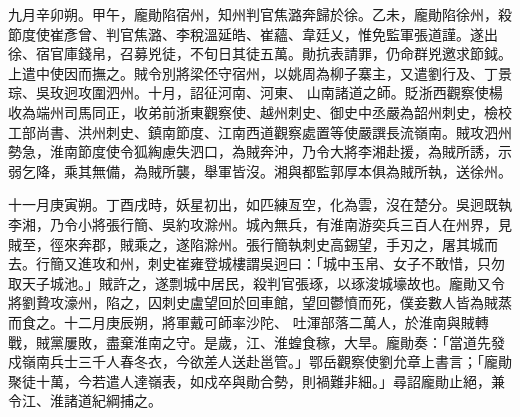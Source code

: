 \begin{pinyinscope}
 九月辛卯朔。甲午，龐勛陷宿州，知州判官焦潞奔歸於徐。乙未，龐勛陷徐州，殺節度使崔彥曾、判官焦潞、李稅溫延皓、崔蘊、韋廷乂，惟免監軍張道謹。遂出徐、宿官庫錢帛，召募兇徒，不旬日其徒五萬。勛抗表請罪，仍命群兇邀求節鉞。上遣中使因而撫之。賊令別將梁伾守宿州，以姚周為柳子寨主，又遣劉行及、丁景琮、吳玫迥攻圍泗州。十月，詔征河南、河東、
 山南諸道之師。貶浙西觀察使楊收為端州司馬同正，收弟前浙東觀察使、越州刺史、御史中丞嚴為韶州刺史，檢校工部尚書、洪州刺史、鎮南節度、江南西道觀察處置等使嚴譔長流嶺南。賊攻泗州勢急，淮南節度使令狐綯慮失泗口，為賊奔沖，乃令大將李湘赴援，為賊所誘，示弱乞降，乘其無備，為賊所襲，舉軍皆沒。湘與都監郭厚本俱為賊所執，送徐州。



 十一月庚寅朔。丁酉戌時，妖星初出，如匹練亙空，化為雲，沒在楚分。吳迥既執
 李湘，乃令小將張行簡、吳約攻滁州。城內無兵，有淮南游奕兵三百人在州界，見賊至，徑來奔郡，賊乘之，遂陷滁州。張行簡執刺史高錫望，手刃之，屠其城而去。行簡又進攻和州，刺史崔雍登城樓謂吳迥曰：「城中玉帛、女子不敢惜，只勿取天子城池。」賊許之，遂剽城中居民，殺判官張琢，以琢浚城壕故也。龐勛又令將劉贄攻濠州，陷之，囚刺史盧望回於回車館，望回鬱憤而死，僕妾數人皆為賊蒸而食之。十二月庚辰朔，將軍戴可師率沙陀、
 吐渾部落二萬人，於淮南與賊轉戰，賊黨屢敗，盡棄淮南之守。是歲，江、淮蝗食稼，大旱。龐勛奏：「當道先發戍嶺南兵士三千人春冬衣，今欲差人送赴邕管。」鄂岳觀察使劉允章上書言；「龐勛聚徒十萬，今若遣人達嶺表，如戍卒與勛合勢，則禍難非細。」尋詔龐勛止絕，兼令江、淮諸道紀綱捕之。




\end{pinyinscope}
